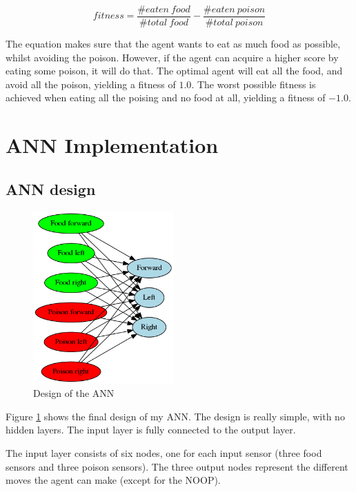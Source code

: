 \documentclass[
]{article}
\begin{document}
\begin{equation}
    fitness = \frac{\#eaten\ food}{\#total\ food} - \frac{\#eaten\ poison}{\#total\ poison}
    \label{eq:fitness_function}
\end{equation}

The equation makes sure that the agent wants to eat as much food as possible, whilst avoiding the poison. However, if the agent can acquire a higher score by eating some poison, it will do that. The optimal agent will eat all the food, and avoid all the poison, yielding a fitness of $1.0$. The worst possible fitness is achieved when eating all the poising and no food at all, yielding a fitness of $-1.0$.


\section{ANN Implementation}
\subsection{ANN design}

\begin{figure}
  \begin{center}
    \includegraphics[width=0.48\textwidth]{network.png}
  \end{center}
  \caption{Design of the ANN}
  \label{fig:network}
\end{figure}

Figure \ref{fig:network} shows the final design of my ANN. The design is really simple, with no hidden layers. The input layer is fully connected to the output layer.

The input layer consists of six nodes, one for each input sensor (three food sensors and three poison sensors). The three output nodes represent the different moves the agent can make (except for the NOOP).
\end{document}
